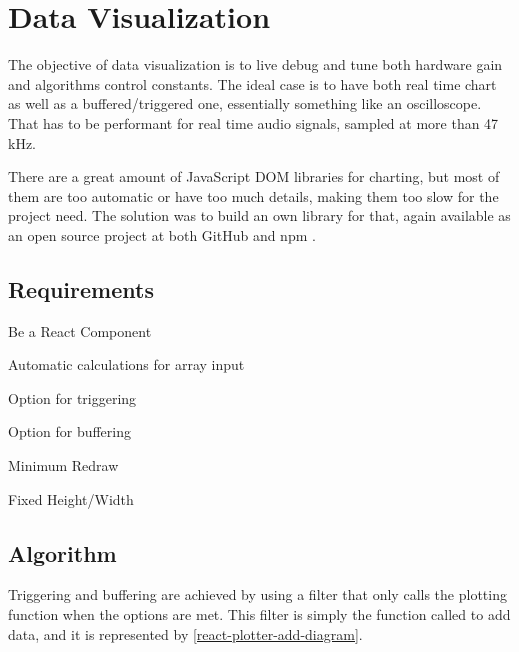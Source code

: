 \section{Data Visualization}
\label{data-visualization}

The objective of data visualization is to live debug and tune both hardware gain
and algorithms control constants. The ideal case is to have both real time chart
as well as a buffered/triggered one, essentially something like an oscilloscope.
That has to be performant for real time audio signals, sampled at more than 47 kHz.

There are a great amount of JavaScript DOM libraries for charting, but most of
them are too automatic or have too much details, making them too slow for the project need.
The solution was to build an own library for that, again available as an open source
project at both GitHub and npm \cite{react-plotter}.

\subsection{Requirements}
\label{data-visualization-requirements}
\begin{itemlist}
  \item Be a React Component
  \item Automatic calculations for array input
  \item Option for triggering
  \item Option for buffering
  \item Minimum Redraw
  \item Fixed Height/Width
\end{itemlist}

\subsection{Algorithm}
Triggering and buffering are achieved by using a filter that only calls the plotting
function when the options are met. This filter is simply the function called to
add data, and it is represented by \autoref{react-plotter-add-diagram}. 

